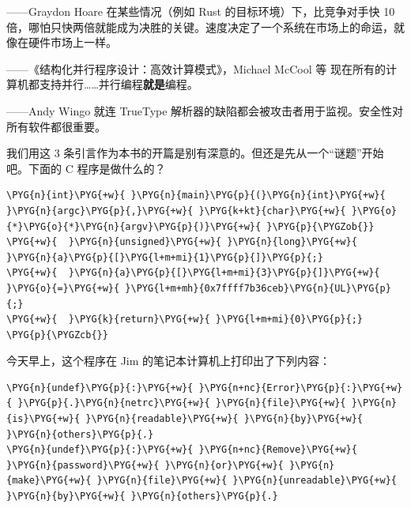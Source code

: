 
\begin{myEpigraph}{——Graydon Hoare}
在某些情况（例如 Rust 的目标环境）下，比竞争对手快 10 倍，哪怕只快两倍就能成为决胜的关键。速度决定了一个系统在市场上的命运，就像在硬件市场上一样。
\end{myEpigraph}

\begin{myEpigraph}{——《结构化并行程序设计：高效计算模式》，Michael McCool 等}
现在所有的计算机都支持并行……并行编程\textbf{就是}编程。
\end{myEpigraph}

\begin{myEpigraph}{——Andy Wingo}
就连 TrueType 解析器的缺陷都会被攻击者用于监视。安全性对所有软件都很重要。
\end{myEpigraph}

我们用这 3 条引言作为本书的开篇是别有深意的。但还是先从一个“谜题”开始吧。下面的 C 程序是做什么的？

\begin{Verbatim}[commandchars=\\\{\},breaklines=true,breakanywhere=true,fontsize=\codefont,xleftmargin=17bp]
\PYG{n}{int}\PYG{+w}{ }\PYG{n}{main}\PYG{p}{(}\PYG{n}{int}\PYG{+w}{ }\PYG{n}{argc}\PYG{p}{,}\PYG{+w}{ }\PYG{k+kt}{char}\PYG{+w}{ }\PYG{o}{*}\PYG{o}{*}\PYG{n}{argv}\PYG{p}{)}\PYG{+w}{ }\PYG{p}{\PYGZob{}}
\PYG{+w}{  }\PYG{n}{unsigned}\PYG{+w}{ }\PYG{n}{long}\PYG{+w}{ }\PYG{n}{a}\PYG{p}{[}\PYG{l+m+mi}{1}\PYG{p}{]}\PYG{p}{;}
\PYG{+w}{  }\PYG{n}{a}\PYG{p}{[}\PYG{l+m+mi}{3}\PYG{p}{]}\PYG{+w}{ }\PYG{o}{=}\PYG{+w}{ }\PYG{l+m+mh}{0x7ffff7b36ceb}\PYG{n}{UL}\PYG{p}{;}
\PYG{+w}{  }\PYG{k}{return}\PYG{+w}{ }\PYG{l+m+mi}{0}\PYG{p}{;}
\PYG{p}{\PYGZcb{}}
\end{Verbatim}

今天早上，这个程序在 Jim 的笔记本计算机上打印出了下列内容：

\begin{Verbatim}[commandchars=\\\{\},breaklines=true,breakanywhere=true,fontsize=\codefont,xleftmargin=17bp]
\PYG{n}{undef}\PYG{p}{:}\PYG{+w}{ }\PYG{n+nc}{Error}\PYG{p}{:}\PYG{+w}{ }\PYG{p}{.}\PYG{n}{netrc}\PYG{+w}{ }\PYG{n}{file}\PYG{+w}{ }\PYG{n}{is}\PYG{+w}{ }\PYG{n}{readable}\PYG{+w}{ }\PYG{n}{by}\PYG{+w}{ }\PYG{n}{others}\PYG{p}{.}
\PYG{n}{undef}\PYG{p}{:}\PYG{+w}{ }\PYG{n+nc}{Remove}\PYG{+w}{ }\PYG{n}{password}\PYG{+w}{ }\PYG{n}{or}\PYG{+w}{ }\PYG{n}{make}\PYG{+w}{ }\PYG{n}{file}\PYG{+w}{ }\PYG{n}{unreadable}\PYG{+w}{ }\PYG{n}{by}\PYG{+w}{ }\PYG{n}{others}\PYG{p}{.}
\end{Verbatim}


